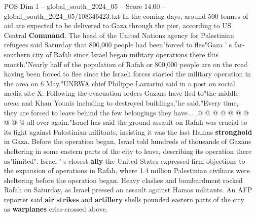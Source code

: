 \begin{textsample}{POS Dim 1 – global\_south\_2024\_05 – Score 14.00 – global\_south\_2024\_05/108346423.txt}
In the coming days, around 500 tonnes of aid are expected to be delivered to Gaza through the pier, according to US Central \textbf{Command}.
The head of the United Nations agency for Palestinian refugees said Saturday that 800,000 people had been"forced to flee"Gaza ' s far-southern city of Rafah since Israel began military operations there this month."Nearly half of the population of Rafah or 800,000 people are on the road having been forced to flee since the Israeli forces started the military operation in the area on 6 May,"UNRWA chief Philippe Lazzarini said in a post on social media site X.
Following the evacuation orders Gazans have fled to"the middle areas and Khan Younis including to destroyed buildings,"he said."Every time, they are forced to leave behind the few belongings they have.... @ @ @ @ @ @ @ @ @ @ all over again."Israel has said the ground assault on Rafah was crucial to its fight against Palestinian militants, insisting it was the last Hamas \textbf{stronghold} in Gaza.
Before the operation began, Israel told hundreds of thousands of Gazans sheltering in some eastern parts of the city to leave, describing its operation there as"limited".
Israel ' s closest \textbf{ally} the United States expressed firm objections to the expansion of operations in Rafah, where 1.4 million Palestinian civilians were sheltering before the operation began.
Heavy clashes and bombardment rocked Rafah on Saturday, as Israel pressed an assault against Hamas militants.
An AFP reporter said \textbf{air} \textbf{strikes} and \textbf{artillery} shells pounded eastern parts of the city as \textbf{warplanes} criss-crossed above.

\end{textsample}
